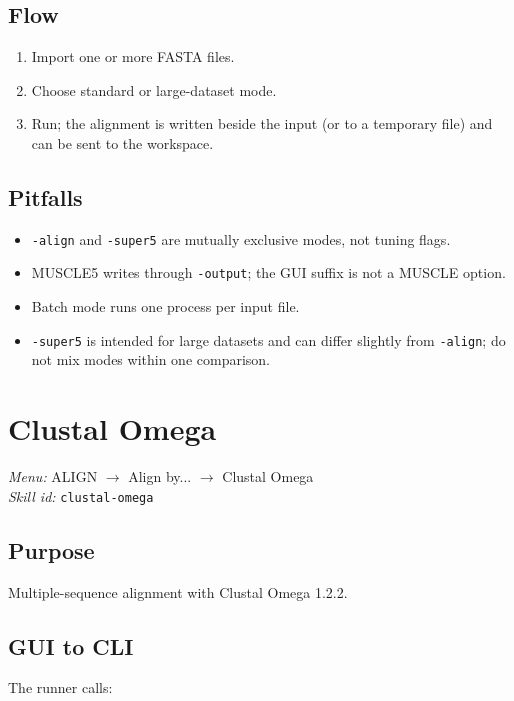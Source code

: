 \documentclass[11pt]{report}
\begin{document}
\subsection{Flow}

\begin{enumerate}
  \item Import one or more FASTA files.
  \item Choose standard or large-dataset mode.
  \item Run; the alignment is written beside the input (or to a temporary file) and can be sent to the workspace.
\end{enumerate}

\subsection{Pitfalls}

\begin{itemize}
  \item \texttt{-align} and \texttt{-super5} are mutually exclusive modes, not tuning flags.
  \item MUSCLE5 writes through \texttt{-output}; the GUI suffix is not a MUSCLE option.
  \item Batch mode runs one process per input file.
  \item \texttt{-super5} is intended for large datasets and can differ slightly from \texttt{-align}; do not mix modes within one comparison.
\end{itemize}


\section{Clustal Omega}
\noindent\textit{Menu:} ALIGN $\rightarrow$ Align by... $\rightarrow$ Clustal Omega\\
\noindent\textit{Skill id:} \texttt{clustal-omega}

\subsection{Purpose}

Multiple-sequence alignment with Clustal Omega 1.2.2.

\subsection{GUI to CLI}

The runner calls:
\end{document}
